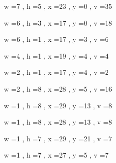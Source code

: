\documentclass[11pt]{article}
\begin{document}
w =7 , h =5 , x =23 , y =0 , v =35
\par
w =6 , h =3 , x =17 , y =0 , v =18
\par
w =6 , h =1 , x =17 , y =3 , v =6
\par
w =4 , h =1 , x =19 , y =4 , v =4
\par
w =2 , h =1 , x =17 , y =4 , v =2
\par
w =2 , h =8 , x =28 , y =5 , v =16
\par
w =1 , h =8 , x =29 , y =13 , v =8
\par
w =1 , h =8 , x =28 , y =13 , v =8
\par
w =1 , h =7 , x =29 , y =21 , v =7
\par
w =1 , h =7 , x =27 , y =5 , v =7
\par
\newpage
\end{document}
